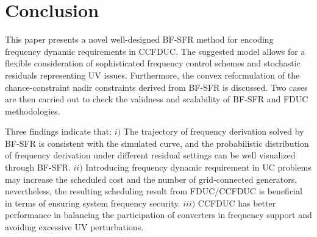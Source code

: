 \documentclass[lettersize,journal]{IEEEtran}
\begin{document}
\vspace{-0.125in}
\section{Conclusion}
\vspace{-0.05in}

This paper presents a novel well-designed BF-SFR method for encoding frequency dynamic requirements in CCFDUC. The suggested model allows for a flexible consideration of sophisticated frequency control schemes and stochastic residuals representing UV issues. Furthermore, the convex reformulation of the chance-constraint nadir constraints derived from BF-SFR is discussed. Two cases are then carried out to check the validness and scalability of BF-SFR and FDUC methodologies.

Three findings indicate that:
$i)$	The trajectory of frequency derivation solved by BF-SFR is consistent with the simulated curve, and the probabilistic distribution of frequency derivation under different residual settings can be well visualized through BF-SFR.
$ii)$	Introducing frequency dynamic requirement in UC problems may increase the scheduled cost and the number of grid-connected generators, nevertheless, the resulting scheduling result from FDUC/CCFDUC is beneficial in terms of ensuring system frequency security.
$iii)$	CCFDUC has better performance in balancing the participation of converters in frequency support and avoiding excessive UV perturbations.



\vspace{-0.1in}
\end{document}
